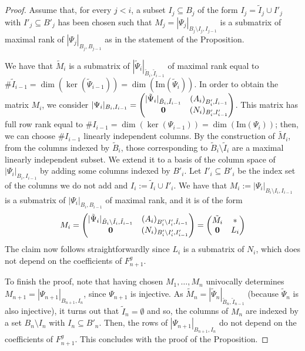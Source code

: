 \documentclass[10pt,a4paper]{amsart}
\begin{document}
\begin{proof}
Assume that, for every $j<i$, a subset $I_{j}\subseteq B_j$ of the form  $I_{j}=\tilde{I}_{j} \cup I'_{j}$ with  $I'_{j}\subseteq B'_{j}$ has been chosen such that
$M_j= |\Psi_j|_{B_j\setminus I_j, I_{j-1}}$ is a submatrix of maximal rank of $|\Psi_j|_{B_j, B_{j-1}}$ as in the statement of the Proposition.


We have that $\tilde{M}_i$ is a submatrix of $|\tilde{\Psi}_{i}|_{ \tilde{B}_i, \tilde{I}_{i-1}}$ of maximal rank equal to $\#\tilde{I}_{i-1} = \dim(\ker(\tilde{\Psi}_{i-1})) = \dim(\mbox{Im}(\tilde{\Psi}_i))$.
In order to obtain the matrix $M_i$, we consider $|\Psi_i|_{B_i, I_{i-1}}=\begin{pmatrix}
 |\tilde{\Psi}_{i}|_{ \tilde{B}_i, \tilde{I}_{i-1}}& (A_i)_{B'_i,\tilde{I}_{i-1}}\\
 {\bf 0}& (N_i)_{B'_{i},I'_{i-1}}\end{pmatrix}$.
This matrix has full row rank equal to $\#I_{i-1}=\dim(\ker(\Psi_{i-1}))= \dim(\mbox{Im}(\Psi_i))$; then, we can choose $\#I_{i-1}$ linearly independent columns. By the construction of $\tilde{M}_i$, from the columns indexed by $\tilde{B}_i$, those corresponding to $\tilde{B}_i\setminus \tilde{I}_i$ are a maximal linearly independent subset. We extend it to a basis of the column space of $|\Psi_i|_{B_i, I_{i-1}}$  by adding some columns indexed by $B'_i$. Let $I'_i\subseteq B'_i$ be the index set of the columns we do not add and $I_i:= \tilde{I}_i \cup I'_i$. We have that $M_i:=|\Psi_{i}|_{ B_i\setminus I_i, I_{i-1}}$ is a submatrix of $|\Psi_i|_{B_i, B_{i-1}}$ of maximal rank, and it is of the form
$$M_i = \begin{pmatrix}
 |\tilde{\Psi}_{i}|_{ \tilde{B}_i\setminus \tilde{I}_i, \tilde{I}_{i-1}}& (A_i)_{B'_i\setminus I'_i,\tilde{I}_{i-1}}\\
 {\bf 0}& (N_i)_{B'_{i}\setminus I'_i,I'_{i-1}}\end{pmatrix} = \begin{pmatrix}
\tilde{M}_{i} &*\\
 {\bf 0}& L_i\end{pmatrix}$$
The claim now follows straightforwardly since $L_i$ is a submatrix of $N_i$, which does not depend on the coefficients of $F_{n+1}^g$.

To finish the proof, note that having chosen $M_1,\ldots, M_n$ univocally determines $M_{n+1}=|\Psi_{n+1}|_{B_{n+1}, I_{n}}$, since $\Psi_{n+1}$ is injective. As $\tilde{M}_n = |\tilde{\Psi}_n|_{\tilde{B}_n, \tilde{I}_{n-1}}$ (because $\tilde{\Psi}_n$ is also injective),  it turns out that $\tilde{I}_n = \emptyset$ and so, the columns of $M_n$ are indexed by a set $B_n\setminus I_n$ with
$I_n\subseteq B'_n$. Then, the rows of $|\Psi_{n+1}|_{B_{n+1}, I_{n}}$ do not depend on the coefficients of $F_{n+1}^g$. This concludes with the proof of the Proposition.
\end{proof}
\end{document}
